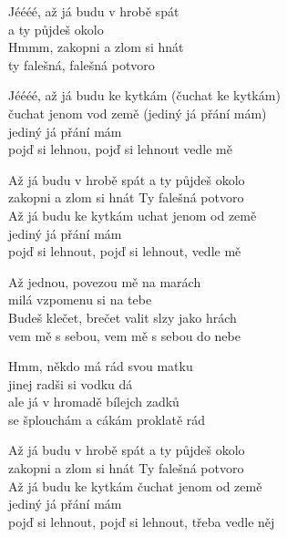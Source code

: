 
\ve{}
Jéééé, až já budu v hrobě spát \\
a ty půjdeš okolo \\
Hmmm, zakopni a zlom si hnát \\
ty falešná, falešná potvoro

\ve{}
Jéééé, až já budu ke kytkám (čuchat ke kytkám)\\
čuchat jenom vod země (jediný já přání mám)\\
jediný já přání mám\\
pojď si lehnou, pojď si lehnout vedle mě

\cho{}
Až já budu v hrobě spát a ty půjdeš okolo\\
zakopni a zlom si hnát Ty falešná potvoro\\
Až já budu ke kytkám uchat jenom od země\\
jediný já přání mám\\
pojď si lehnout, pojď si lehnout, vedle mě

\ve{}
Až jednou, povezou mě na marách\\ 
milá vzpomenu si na tebe\\
Budeš klečet, brečet valit slzy jako hrách\\
vem mě s sebou, vem mě s sebou do nebe

\ve{}
Hmm, někdo má rád svou matku\\
jinej radši si vodku dá\\
ale já v hromadě bílejch zadků\\
se šplouchám a cákám proklatě rád

\cho{}
Až já budu v hrobě spát a ty půjdeš okolo\\
zakopni a zlom si hnát Ty falešná potvoro\\
Až já budu ke kytkám čuchat jenom od země\\
jediný já přání mám\\
pojď si lehnout, pojď si lehnout, třeba vedle něj

\esong{}